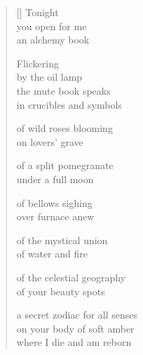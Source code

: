 \documentclass[12pt,a4paper]{article}
\begin{document}

\newpage

\poemtitle{}

\settowidth{\versewidth}{on your body of soft amber}

\bigskip

\begin{verse}[\versewidth]
  Tonight \\
  you open for me \\
  an alchemy book

  Flickering \\
  by the oil lamp \\
  the mute book speaks \\
  in crucibles and symbols

  of wild roses blooming \\
  on lovers' grave

  of a split pomegranate \\
  under a full moon

  of bellows sighing \\
  over furnace anew

  of the mystical union \\
  of water and fire

  of the celestial geography \\
  of your beauty spots

  a secret zodiac for all senses \\
  on your body of soft amber \\
  where I die and am reborn

\end{verse}


\newpage

\poemtitle{}

\settowidth{\versewidth}{and our breaths like geysers}

\bigskip
\end{document}
